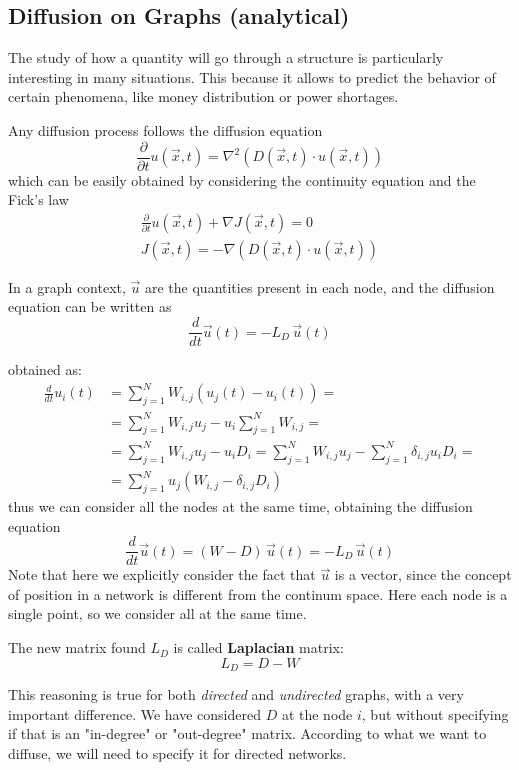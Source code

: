 \documentclass[12pt,a4paper]{article}
\begin{document}
\subsection{Diffusion on Graphs (analytical)}
The study of how a quantity will go through a structure is particularly interesting in many situations. This because it allows to predict the behavior of certain phenomena, like money distribution or power shortages.

Any diffusion process follows the diffusion equation
$$
\frac{\partial }{\partial t}u(\vec{x}, t) = \nabla^2( D(\vec{x},t)\cdot u(\vec{x}, t) )
$$
which can be easily obtained by considering the continuity equation and the Fick's law
\begin{align*}
\frac{\partial }{\partial t}u(\vec{x}, t) + \nabla J(\vec{x},t)=0\\[1em]
J(\vec{x},t) = -\nabla (D(\vec{x},t) \cdot u(\vec{x},t))
\end{align*}

In a graph context, $\vec{u}$ are the quantities present in each node, and the diffusion equation can be written as
$$
\frac{d}{dt}\vec{u}(t) = - L_D \, \vec{u}(t)
$$

obtained as:
\begin{align*}
\frac{d}{dt}u_i(t) &= \sum_{j=1}^N W_{i,j}(u_j(t)-u_i(t)) = \\[1em]
&= \sum_{j=1}^N W_{i,j}u_j - u_i \sum_{j=1}^N W_{i,j} = \\[1em]
&= \sum_{j=1}^N W_{i,j}u_j - u_i D_i = \sum_{j=1}^N W_{i,j}u_j - \sum_{j=1}^N \delta _{i,j} u_i D_i =\\[1em]
&=\sum_{j=1}^N u_j (W_{i,j}- \delta _{i,j}D_i)
\end{align*}
thus we can consider all the nodes at the same time, obtaining the diffusion equation
$$
\frac{d}{dt}\vec{u}(t) = (W-D) \, \vec{u}(t) = -L_D \, \vec{u}(t)
$$
Note that here we explicitly consider the fact that $\vec{u}$ is a vector, since the concept of position in a network is different from the continum space. Here each node is a single point, so we consider all at the same time.

The new matrix found $L_D$ is called \textbf{Laplacian} matrix:
$$
L_D = D-W
$$

This reasoning is true for both \textit{directed} and \textit{undirected} graphs, with a very important difference. We have considered $D$ at the node $i$, but without specifying if that is an "in-degree" or "out-degree" matrix. According to what we want to diffuse, we will need to specify it for directed networks.
\end{document}
